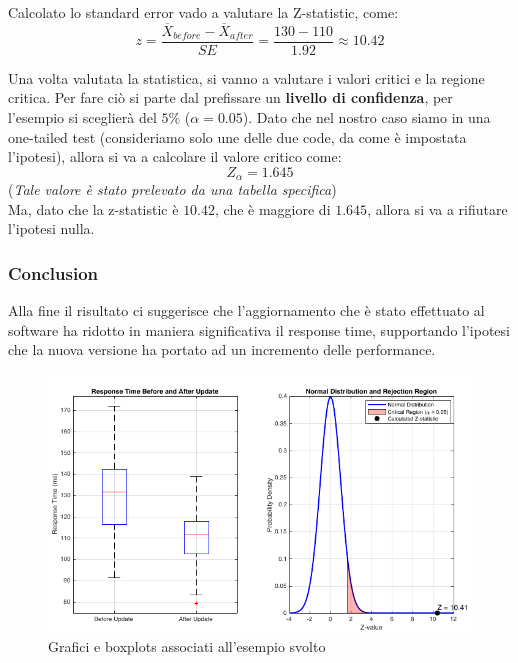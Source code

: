 Calcolato lo standard error vado a valutare la Z-statistic, come:
\[
z = \frac{\overline{X}_{before} - \overline{X}_{after}}{SE} = \frac{130 - 110}{1.92} \approx 10.42
\]

Una volta valutata la statistica, si vanno a valutare i valori critici e la regione critica. Per fare ciò si parte dal prefissare un \textbf{livello di confidenza}, per l'esempio si sceglierà del \(5\%\) (\(\alpha = 0.05\)). Dato che nel nostro caso siamo in una one-tailed test (consideriamo solo une delle due code, da come è impostata l'ipotesi), allora si va a calcolare il valore critico come:
\[
Z_\alpha = 1.645
\]
(\textit{Tale valore è stato prelevato da una tabella specifica})
\\
Ma, dato che la z-statistic è \(10.42\), che è maggiore di \(1.645\), allora si va a rifiutare l'ipotesi nulla.

\subsubsection{Conclusion}
Alla fine il risultato ci suggerisce che l'aggiornamento che è stato effettuato al software ha ridotto in maniera significativa il response time, supportando l'ipotesi che la nuova versione ha portato ad un incremento delle performance.

\begin{figure}[h]
\centering
\includegraphics[width=.6\textwidth]{img/chapter-4/esempio-z-test.png}
\caption{Grafici e boxplots associati all'esempio svolto}
\end{figure}
